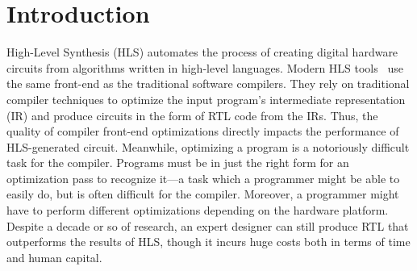 \section{Introduction}
High-Level Synthesis (HLS) automates the process of creating digital hardware circuits from algorithms written in high-level languages.  
Modern HLS tools~\cite{xilinx_vivado_hls,intel_hls,canis2013legup} use the same front-end as the traditional software compilers.  
They rely on traditional compiler techniques to optimize the input program's intermediate representation (IR) and produce circuits in the form of RTL code from the IRs. 
Thus, the quality of compiler front-end optimizations directly impacts the performance of HLS-generated circuit. 
Meanwhile, optimizing a program is a notoriously difficult task for the compiler. 
Programs must be in just the right form for an optimization pass to recognize it---a task which a programmer might be able to easily do, but is often difficult for the compiler.
Moreover, a programmer might have to perform different optimizations depending on the hardware platform.
Despite a decade or so of research, an expert designer can still produce RTL that outperforms the results of HLS, though it incurs huge costs both in terms of time and human capital. 





